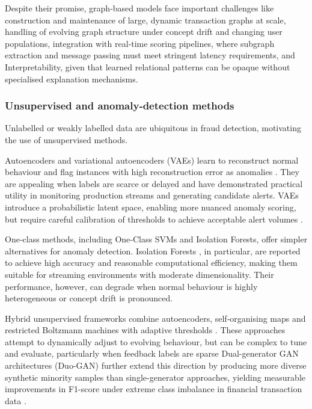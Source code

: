 \documentclass[a4paper,fleqn]{cas-dc}
\begin{document}
Despite their promise, graph‑based models face important challenges like construction and maintenance of large, dynamic transaction graphs at scale, handling of evolving graph structure under concept drift and changing user populations, integration with real‑time scoring pipelines, where subgraph extraction and message passing must meet stringent latency requirements, and Interpretability, given that learned relational patterns can be opaque without specialised explanation mechanisms.


\subsubsection{Unsupervised and anomaly‑detection methods}

Unlabelled or weakly labelled data are ubiquitous in fraud detection, motivating the use of unsupervised methods.

Autoencoders and variational autoencoders (VAEs) learn to reconstruct normal behaviour and flag instances with high reconstruction error as anomalies \cite{cakir_enhanced_2024, ouedraogo_data-driven_2021, kennedy_iterative_2023}. 
They are appealing when labels are scarce or delayed and have demonstrated practical utility in monitoring production streams and generating candidate alerts. 
VAEs introduce a probabilistic latent space, enabling more nuanced anomaly scoring, but require careful calibration of thresholds to achieve acceptable alert volumes \cite{kennedy_synthesizing_2024}.

One‑class methods, including One‑Class SVMs and Isolation Forests, offer simpler alternatives for anomaly detection. Isolation Forests \cite{karnavou_i_2025}, in particular, are reported to achieve high accuracy and reasonable computational efficiency, making them suitable for streaming environments with moderate dimensionality. 
Their performance, however, can degrade when normal behaviour is highly heterogeneous or concept drift is pronounced.

Hybrid unsupervised frameworks combine autoencoders, self‑organising maps and restricted Boltzmann machines with adaptive thresholds \cite{yadav_unsupervised_2022}. 
These approaches attempt to dynamically adjust to evolving behaviour, but can be complex to tune and evaluate, particularly when feedback labels are sparse \cite{kennedy_iterative_2023}
Dual-generator GAN architectures (Duo-GAN) further extend this direction by producing more diverse synthetic minority samples than single-generator approaches, yielding measurable improvements in F1-score under extreme class imbalance in financial transaction data \cite{ferreira_when_2021, zhang_multi-view_2025, zhi_research_2025}.
\end{document}
